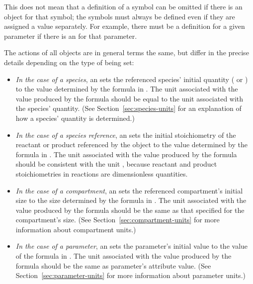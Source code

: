 This does not mean that a definition of a symbol can be omitted if
there is an \InitialAssignment object for that symbol; the symbols
must always be defined even if they are assigned a value
separately.  For example, there must be a \Parameter definition
for a given parameter if there is an \InitialAssignment for that
parameter.

The actions of all \InitialAssignment objects are in general terms
the same, but differ in the precise details depending on the type
of  being set:
\begin{itemize}

\item \emph{In the case of a species}, an \InitialAssignment sets
  the referenced species' initial quantity
  ( or ) to the value
  determined by the formula in .  The unit associated
  with the value produced by the  formula should be
  equal to the unit associated with the species' quantity.  (See
  Section~\ref{sec:species-units} for an explanation of how a
  species' quantity is determined.)

\item \emph{In the case of a species reference}, an
  \InitialAssignment sets the initial stoichiometry of the
  reactant or product referenced by the \SpeciesReference object
  to the value determined by the formula in .  The
  unit associated with the value produced by the 
  formula should be consistent with the unit
  , because reactant and product
  stoichiometries in reactions are dimensionless quantities.

\item \emph{In the case of a compartment}, an \InitialAssignment
  sets the referenced compartment's initial size to the size
  determined by the formula in .  The unit associated
  with the value produced by the  formula should be
  the same as that specified for the compartment's size.  (See
  Section~\ref{sec:compartment-units} for more information about
  compartment units.)

\item \emph{In the case of a parameter}, an \InitialAssignment
  sets the parameter's initial value to the value of the formula
  in .  The unit associated with the value produced by
  the  formula should be the same as parameter's
   attribute value.  (See
  Section~\ref{sec:parameter-units} for more information about
  parameter units.)


\end{itemize}
